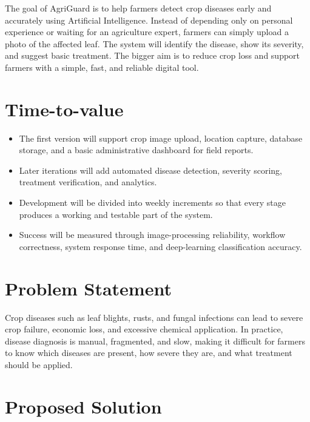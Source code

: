 \documentclass[11pt,a4paper]{article}
\begin{document}
The goal of AgriGuard is to help farmers detect crop diseases early and accurately using Artificial Intelligence.
Instead of depending only on personal experience or waiting for an agriculture expert, farmers can simply upload a photo of the affected leaf. The system will identify the disease, show its severity, and suggest basic treatment.
The bigger aim is to reduce crop loss and support farmers with a simple, fast, and reliable digital tool.


\section{Time-to-value}

\begin{itemize}[leftmargin=0.6cm]

    \item The first version will support crop image upload, location capture, database storage, and a basic administrative dashboard for field reports.

    \item Later iterations will add automated disease detection, severity scoring, treatment verification, and analytics.

    \item Development will be divided into weekly increments so that every stage produces a working and testable part of the system.

    \item Success will be measured through image-processing reliability, workflow correctness, system response time, and deep-learning classification accuracy.

\end{itemize}


\section{Problem Statement}

Crop diseases such as leaf blights, rusts, and fungal infections can lead to severe crop failure, economic loss, and excessive chemical application. In practice, disease diagnosis is manual, fragmented, and slow, making it difficult for farmers to know which diseases are present, how severe they are, and what treatment should be applied.


\section{Proposed Solution}
\end{document}
